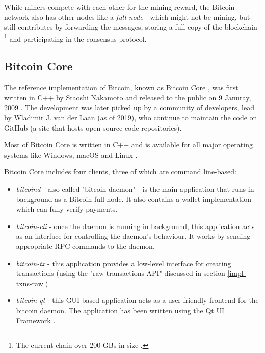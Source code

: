 While miners compete with each other for the mining reward, the Bitcoin network also has other nodes like a \textit{full node} - which might not be mining, but still contributes by forwarding the messages, storing a full copy of the blockchain \footnote{The current chain over 200 GBs in size \cite{bitcoinDownload}.} and participating in the consensus protocol.


\newpage
\subsection{Bitcoin Core} \label{btc-arch}

The reference implementation of Bitcoin, known as Bitcoin Core \cite{bitcoinGithub}, was first written in C++ by Staoshi Nakamoto and released to the public on 9 Januray, 2009 \cite{bitcoinCoreWiki}. The development was later picked up by a community of developers, lead by Wladimir J. van der Laan (as of 2019), who continue to maintain the code on GitHub (a site that hosts open-source code repositories). 



Most of Bitcoin Core is written in C++ and is available for all major operating systems like Windows, macOS and Linux \cite{bitcoinDownload}. 

Bitcoin Core includes four clients, three of which are command line-based: 

\begin{itemize}
    \item \textit{bitcoind} - also called "bitcoin daemon" - is the main application that runs in background as a Bitcoin full node. It also contains a wallet implementation which can fully verify payments.

    \item \textit{bitcoin-cli} - once the daemon is running in background, this application acts as an interface for controlling the daemon's behaviour. It works by sending appropriate RPC commands to the daemon.

    \item \textit{bitcoin-tx} - this application provides a low-level interface for creating transactions (using the "raw transactions API" discussed in section \ref{impl-txns-raw})

    \item \textit{bitcoin-qt} - this GUI based application acts as a user-friendly frontend for the bitcoin daemon. The application has been written using the Qt UI Framework \cite{cppqt}.
\end{itemize}

